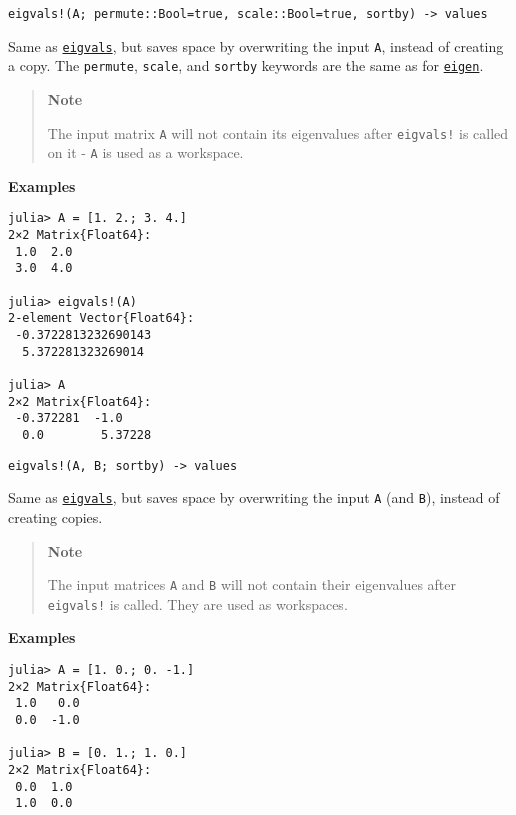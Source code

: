 \begin{adjustwidth}{2em}{0pt}


\begin{verbatim}
eigvals!(A; permute::Bool=true, scale::Bool=true, sortby) -> values
\end{verbatim}

Same as \hyperlink{12334018763942871611}{\texttt{eigvals}}, but saves space by overwriting the input \texttt{A}, instead of creating a copy. The \texttt{permute}, \texttt{scale}, and \texttt{sortby} keywords are the same as for \hyperlink{11056016707394839114}{\texttt{eigen}}.

\begin{quote}
\textbf{Note}

The input matrix \texttt{A} will not contain its eigenvalues after \texttt{eigvals!} is called on it - \texttt{A} is used as a workspace.

\end{quote}
\textbf{Examples}


\begin{verbatim}
julia> A = [1. 2.; 3. 4.]
2×2 Matrix{Float64}:
 1.0  2.0
 3.0  4.0

julia> eigvals!(A)
2-element Vector{Float64}:
 -0.3722813232690143
  5.372281323269014

julia> A
2×2 Matrix{Float64}:
 -0.372281  -1.0
  0.0        5.37228
\end{verbatim}




\begin{lstlisting}
eigvals!(A, B; sortby) -> values
\end{lstlisting}

Same as \hyperlink{12334018763942871611}{\texttt{eigvals}}, but saves space by overwriting the input \texttt{A} (and \texttt{B}), instead of creating copies.

\begin{quote}
\textbf{Note}

The input matrices \texttt{A} and \texttt{B} will not contain their eigenvalues after \texttt{eigvals!} is called. They are used as workspaces.

\end{quote}
\textbf{Examples}


\begin{verbatim}
julia> A = [1. 0.; 0. -1.]
2×2 Matrix{Float64}:
 1.0   0.0
 0.0  -1.0

julia> B = [0. 1.; 1. 0.]
2×2 Matrix{Float64}:
 0.0  1.0
 1.0  0.0


\end{verbatim}
\end{adjustwidth}
